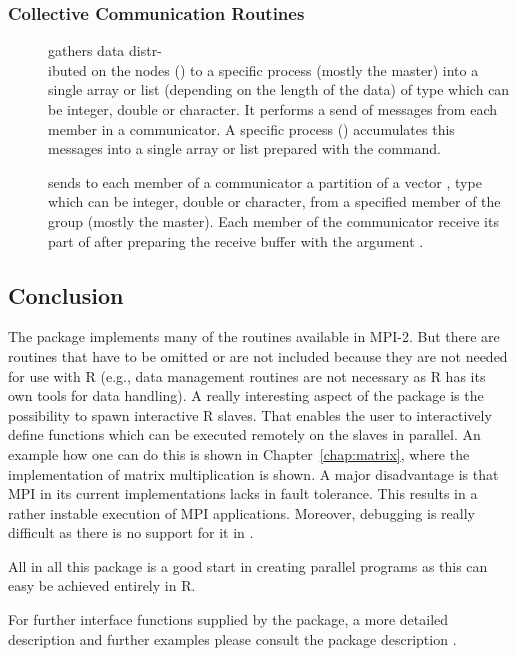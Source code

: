 \subsubsection{Collective Communication Routines}
\begin{description}
\item[] gathers
  data distr-\\ ibuted on the nodes () to a %
  specific process (mostly the master) into a single array or list
  (depending on the length of the data) of type  which can
  be integer, double or character. It
  performs  
  a send of messages from each member in a communicator. A
  specific process () accumulates this messages into a 
  single array or list prepared with the  command.
\item[]
  sends to each member of a communicator a partition of  a vector ,
  type  which can be integer, double or character,
  from a specified member of the group (mostly the master). Each
  member of the communicator receive its part of  after preparing the
  receive buffer with the argument .
\end{description}

\subsection{Conclusion}

The package  implements many of the routines available in
MPI-2. But there are routines that have to be omitted or are not included
because they are not needed for use with R (e.g., data management
routines are not necessary as R has its own tools for data handling).
A really interesting aspect of the  package is the
possibility to spawn interactive R slaves. That enables the user to
interactively 
define functions which can be executed remotely on the slaves in
parallel. An example how one can do this is shown in
Chapter~\ref{chap:matrix}, where the implementation of matrix
multiplication is shown. A major disadvantage is that MPI in its
current implementations lacks in fault tolerance. This results in a
rather instable execution of MPI applications. Moreover, debugging
is really difficult as there is no support for it in .

All in all this package is a good start in creating parallel programs
as this can easy be achieved entirely in R.

For further interface functions supplied by the  package, a
more detailed description and further examples please consult the
package description \cite{yu06Rmpi}.

